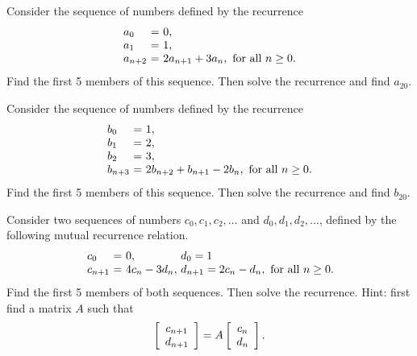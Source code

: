 \documentclass{ximera}
\author{Zack Reed}
\begin{document}
  \begin{exercise}
    Consider the sequence of numbers defined by the recurrence
    \begin{equation*}
      \begin{array}{l@{~}c@{~}l}
        a_0 &=& 0, \\
        a_1 &=& 1, \\
        a_{n+2} &=& 2a_{n+1} + 3a_n, \quad\mbox{for all $n\geq 0$.} \\
      \end{array}
    \end{equation*}
    Find the first 5 members of this sequence. Then solve the recurrence
    and find $a_{20}$.
  \end{exercise}
  
  \begin{exercise}
    Consider the sequence of numbers defined by the recurrence
    \begin{equation*}
      \begin{array}{l@{~}c@{~}l}
        b_0 &=& 1, \\
        b_1 &=& 2, \\
        b_2 &=& 3, \\
        b_{n+3} &=& 2b_{n+2} + b_{n+1} - 2b_n, \quad\mbox{for all $n\geq 0$.} \\
      \end{array}
    \end{equation*}
    Find the first 5 members of this sequence. Then solve the recurrence
    and find $b_{20}$.
  \end{exercise}
  
  \begin{exercise}
    Consider two sequences of numbers $c_0,c_1,c_2,\ldots$ and
    $d_0,d_1,d_2,\ldots$, defined by the following mutual recurrence
    relation.
    \begin{equation*}
      \begin{array}{l@{~}c@{~}l@{\quad}l@{~}c@{~}l}
        c_0 &=& 0,             & d_0 = 1 \\
        c_{n+1} &=& 4c_n - 3d_n, & d_{n+1} = 2c_n - d_n, \quad\mbox{for all $n\geq 0$.} \\
      \end{array}
    \end{equation*}
    Find the first 5 members of both sequences. Then solve the
    recurrence. Hint: first find a matrix $A$ such that
    \begin{equation*}
      \startmat{c} c_{n+1} \\ d_{n+1} \stopmat
      = A \startmat{c} c_n \\ d_n \stopmat.
    \end{equation*}
  \end{exercise}
  
\end{document}
